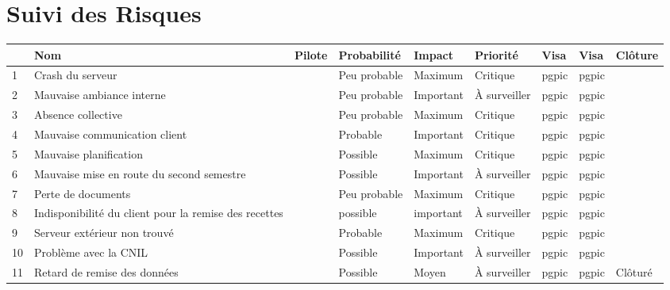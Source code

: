 \documentclass[asi]{picInsa}
\begin{document}
\chapter*{Suivi des Risques}
\begin{longtable}{|p{0.3cm}|p{2.5cm}|p{2cm}|p{2cm}|p{1.8cm}|p{1.5cm}|p{1cm}|p{1cm}|p{1.5cm}|}
			\hline
			\rowcolor{gray!40}
			\No & Nom & Pilote & Probabilité & Impact & Priorité & Visa \RQCourt{} & Visa \CPCourt{} & Clôture \\\hline
			
			 1 & Crash du serveur & \Matthieu & Peu probable & Maximum & Critique & pgpic & pgpic & \\\hline
			 
			 2 & Mauvaise ambiance interne & \Michel & Peu probable & Important & À surveiller & pgpic & pgpic & \\\hline
			 
			 3 & Absence collective & \Pierre & Peu probable & Maximum & Critique & pgpic & pgpic & \\\hline
			 
			 4 & Mauvaise communication client & \Julie & Probable & Important & Critique & pgpic & pgpic & \\\hline
			 
			 5 & Mauvaise planification & \Florian & Possible & Maximum & Critique & pgpic & pgpic & \\\hline
			 
			 6 & Mauvaise mise en route du second semestre & \Melissa & Possible & Important & À surveiller & pgpic & pgpic & \\\hline
			 
			 7 & Perte de documents & \Mathieu & Peu probable & Maximum & Critique & pgpic & pgpic & \\\hline
			 
			 8 & Indisponibilité du client pour la remise des recettes & \Julie & possible & important & À surveiller & pgpic & pgpic & \\\hline
			 
			 9 & Serveur extérieur non trouvé & \Matthieu & Probable & Maximum & Critique & pgpic & pgpic & \\\hline
			 
			 10 & Problème avec la CNIL & \Pierre & Possible & Important & À surveiller & pgpic & pgpic & \\\hline
			 
			 11 & Retard de remise des données & \Sergi & Possible & Moyen & À surveiller & pgpic & pgpic & Clôturé \\\hline
			 

\end{longtable}
\end{document}
